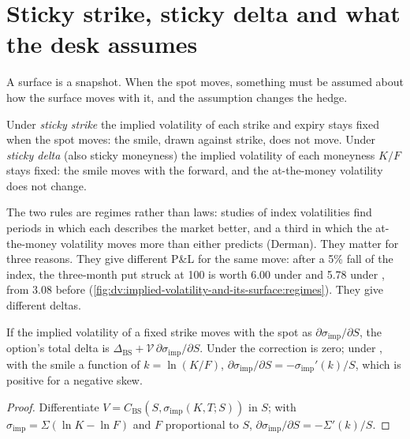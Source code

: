 \section{Sticky strike, sticky delta and what the desk assumes}

A surface is a snapshot. When the spot moves, something must be assumed about how the
surface moves with it, and the assumption changes the hedge.

\begin{definition}\label{def:dv:implied-volatility-and-its-surface:sticky}
Under \emph{sticky strike} the implied volatility of each strike
and expiry stays fixed when the spot moves: the smile, drawn against strike, does not
move. Under \emph{sticky delta} (also sticky moneyness) the implied
volatility of each moneyness $K/F$ stays fixed: the smile moves with the forward, and
the at-the-money volatility does not change.
\end{definition}

The two rules are regimes rather than laws: studies of index volatilities find periods
in which each describes the market better, and a third in which the at-the-money
volatility moves more than either predicts (Derman). They matter for three reasons.
They give different P\&L for the same move: after a 5\% fall of the index, the
three-month put struck at 100 is worth 6.00 under  and 5.78 under , from 3.08 before (\cref{fig:dv:implied-volatility-and-its-surface:regimes}).
They give different deltas.

\begin{proposition}\label{prop:dv:implied-volatility-and-its-surface:delta}
If the implied volatility of a fixed strike moves with the spot as $\partial\sigma_{\mathrm{imp}}/\partial S$,
the option's total delta is $\Delta_{\mathrm{BS}}+\mathcal V\,\partial\sigma_{\mathrm{imp}}/\partial S$.
Under  the correction is zero; under , with the smile a function
of $k=\ln(K/F)$, $\partial\sigma_{\mathrm{imp}}/\partial S=-\sigma_{\mathrm{imp}}'(k)/S$, which is
positive for a negative skew.
\end{proposition}
\begin{proof}
Differentiate $V=C_{\mathrm{BS}}(S,\sigma_{\mathrm{imp}}(K,T;S))$ in $S$; with
$\sigma_{\mathrm{imp}}=\Sigma(\ln K-\ln F)$ and $F$ proportional to $S$,
$\partial\sigma_{\mathrm{imp}}/\partial S=-\Sigma'(k)/S$.
\end{proof}

